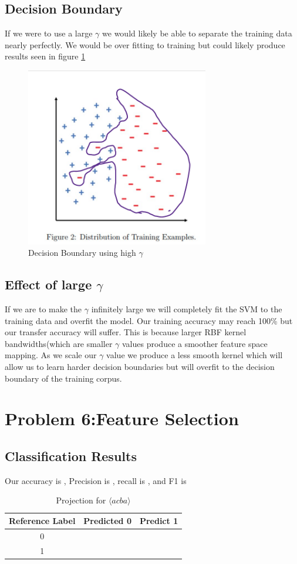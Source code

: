 \documentclass[11pt]{article}
\begin{document}
\subsection{Decision Boundary}
If we were to use a large $\gamma$ we would likely be able to separate the training data nearly perfectly. We would be over fitting to training but could likely produce results seen in figure \ref{fig:bound}
\begin{figure}[]
\centering
\includegraphics[width=8cm]{Assignments/Assignment1/decisionbound.png}
\caption{Decision Boundary using high $\gamma$}
\label{fig:bound}
\end{figure}
\subsection{Effect of large $\gamma$}
If we are to make the $\gamma$ infinitely large we will completely fit the SVM to the training data and overfit the model. Our training accuracy may reach 100\% but our transfer accuracy will suffer. This is because larger RBF kernel bandwidths(which are smaller $\gamma$ values produce a smoother feature space mapping. As we scale our $\gamma$ value we produce a less smooth kernel which will allow us to learn harder decision boundaries but will overfit to the decision boundary of the training corpus. 
\section{Problem 6:Feature Selection}
\subsection{Classification Results}
Our accuracy is , Precision is , recall is , and F1 is 
\begin{table}[]
    \centering
    \begin{tabular}{|c|c|c|} \hline
       Reference Label  & Predicted 0 & Predict 1   \\ \hline
       0 & & \\ \hline
       1 & & \\ \hline
    \end{tabular}
    \caption{Projection for $\langle acba\rangle$}
    \label{tab:Accuracy}
\end{table}
\end{document}

